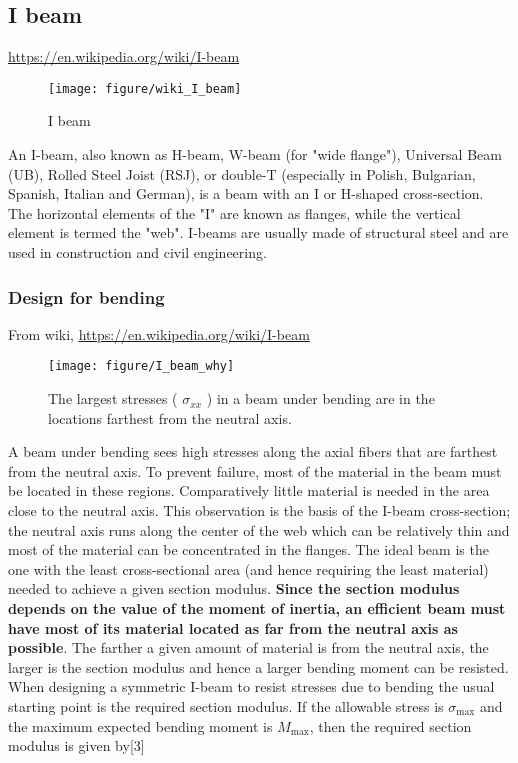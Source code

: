 \subsection{I beam}
\url{https://en.wikipedia.org/wiki/I-beam}
\begin{figure}[h!]
\centering
\texttt{[image: figure/wiki\_I\_beam]}
\caption{I beam}
\label{fig:wikiibeam}
\end{figure}

An I-beam, also known as H-beam, W-beam (for "wide flange"), Universal Beam (UB), Rolled Steel Joist (RSJ), or double-T (especially in Polish, Bulgarian, Spanish, Italian and German), is a beam with an I or H-shaped cross-section. The horizontal elements of the "I" are known as flanges, while the vertical element is termed the "web". I-beams are usually made of structural steel and are used in construction and civil engineering.

\subsubsection{Design for bending}
From wiki, \url{https://en.wikipedia.org/wiki/I-beam}

\begin{figure}[h!]
\centering
\texttt{[image: figure/I\_beam\_why]}
\caption{The largest stresses ( $ \sigma_{xx} $ ) in a beam under bending are in the locations farthest from the neutral axis.}
\label{fig:ibeamwhy}
\end{figure}

A beam under bending sees high stresses along the axial fibers that are farthest from the neutral axis. To prevent failure, most of the material in the beam must be located in these regions. Comparatively little material is needed in the area close to the neutral axis. This observation is the basis of the I-beam cross-section; the neutral axis runs along the center of the web which can be relatively thin and most of the material can be concentrated in the flanges.
The ideal beam is the one with the least cross-sectional area (and hence requiring the least material) needed to achieve a given section modulus. \textbf{Since the section modulus depends on the value of the moment of inertia, an efficient beam must have most of its material located as far from the neutral axis as possible}. The farther a given amount of material is from the neutral axis, the larger is the section modulus and hence a larger bending moment can be resisted.
When designing a symmetric I-beam to resist stresses due to bending the usual starting point is the required section modulus. If the allowable stress is  $ \sigma _{\mathrm {max} } $ and the maximum expected bending moment is $ M_{\mathrm  {max}} $, then the required section modulus is given by[3]
	
